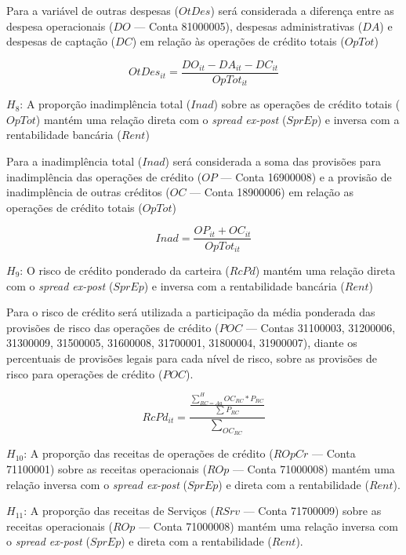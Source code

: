 \documentclass[
  12pt,
  12pt,
  openright,
  oneside,
  a4paper,
  chapter=TITLE,
  section=TITLE,
  subsection=TITLE,
  subsubsection=TITLE,
  english,
  portugues,
  sumario=tradicional]{abntex2}
\begin{document}
Para a variável de outras despesas (\(OtDes\)) será considerada a diferença entre as despesa operacionais (\(DO\) --- Conta 81000005), despesas administrativas (\(DA\)) e despesas de captação (\(DC\)) em relação às operações de crédito totais (\(OpTot\))

\begin{equation}
OtDes_{it} = \frac{ DO_{it} - DA_{it} - DC_{it} }{ OpTot_{it} }
\end{equation}

\(H_{8}\): A proporção inadimplência total (\(Inad\)) sobre as operações de crédito totais (\(OpTot\)) mantém uma relação direta com o \emph{spread ex-post} (\(SprEp\)) e inversa com a rentabilidade bancária (\(Rent\))

Para a inadimplência total (\(Inad\)) será considerada a soma das provisões para inadimplência das operações de crédito (\(OP\) --- Conta 16900008) e a provisão de inadimplência de outras créditos (\(OC\) --- Conta 18900006) em relação as operações de crédito totais (\(OpTot\))

\begin{equation}
Inad = \frac{ OP_{it} + OC_{it} }{OpTot_{it}}
\end{equation}

\(H_{9}\): O risco de crédito ponderado da carteira (\(RcPd\)) mantém uma relação direta com o \emph{spread ex-post} (\(SprEp\)) e inversa com a rentabilidade bancária (\(Rent\))

Para o risco de crédito será utilizada a participação da média ponderada das provisões de risco das operações de crédito (\(POC\) --- Contas 31100003, 31200006, 31300009, 31500005, 31600008, 31700001, 31800004, 31900007), diante os percentuais de provisões legais para cada nível de risco, sobre as provisões de risco para operações de crédito (\(POC\)).

\begin{equation}
RcPd_{it} = \frac{\frac{\sum_{RC = Aa}^HOC_{RC}*P_{RC}}{\sum_{}P_{RC}}}{\sum_{OC_{RC}}}
\end{equation}

\(H_{10}\): A proporção das receitas de operações de crédito (\(ROpCr\) --- Conta 71100001) sobre as receitas operacionais (\(ROp\) --- Conta 71000008) mantém uma relação inversa com o \emph{spread ex-post} (\(SprEp\)) e direta com a rentabilidade (\(Rent\)).

\(H_{11}\): A proporção das receitas de Serviços (\(RSrv\) --- Conta 71700009) sobre as receitas operacionais (\(ROp\) --- Conta 71000008) mantém uma relação inversa com o \emph{spread ex-post} (\(SprEp\)) e direta com a rentabilidade (\(Rent\)).
\end{document}
